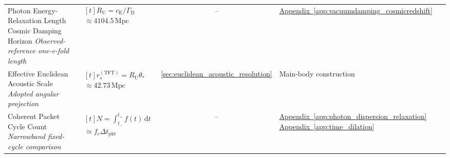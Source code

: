 \begin{longtable}{@{} p{4.5cm} p{6cm} c p{4cm} @{}}
{\raggedright Photon Energy-Relaxation Length Cosmic Damping Horizon \newline \textit{Observed-reference one-e-fold length}\par} & {\raggedright $\begin{gathered}[t]R_{\mathrm U}=c_{\mathrm E}/\Gamma_{\mathrm D} \\ \approx4104.5\,\mathrm{Mpc}\end{gathered}$\par} & -- & {\raggedright \hyperref[app:vacuumdamping_cosmicredshift]{Appendix~\ref*{app:vacuumdamping_cosmicredshift}}\par} \\

{\raggedright Effective Euclidean Acoustic Scale \newline \textit{Adopted angular projection}\par} & {\raggedright $\begin{gathered}[t]r_s^{(\mathrm{TFT})}=R_{\mathrm U}\theta_* \\ \approx42.73\,\mathrm{Mpc}\end{gathered}$\par} & \hyperref[sec:euclidean_acoustic_resolution]{\ref*{sec:euclidean_acoustic_resolution}} & {\raggedright Main-body construction\par} \\

{\raggedright Coherent Packet Cycle Count \newline \textit{Narrowband fixed-cycle comparison}\par} & {\raggedright $\begin{gathered}[t]N=\int_{t_-}^{t_+}f(t)\,\mathrm dt \\ \simeq f_c\Delta t_{\mathrm{pkt}}\end{gathered}$\par} & -- & {\raggedright \hyperref[app:photon_dispersion_relaxation]{Appendix~\ref*{app:photon_dispersion_relaxation}} \newline \hyperref[app:time_dilation]{Appendix~\ref*{app:time_dilation}}\par} \\


\end{longtable}
